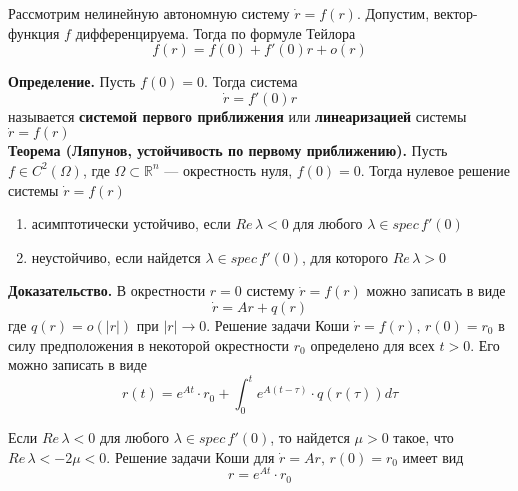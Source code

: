 Рассмотрим нелинейную автономную систему $\dot{r} = f(r)$. Допустим, вектор-функция $f$ дифференцируема. Тогда по формуле Тейлора
\begin{equation*}
    f(r) = f(0) + f'(0)r + o(r)
\end{equation*}

\noindent \textbf{Определение.} Пусть $f(0) = 0$. Тогда система
\begin{equation*}
    \dot{r} = f'(0)r
\end{equation*}
называется \textbf{системой первого приближения} или \textbf{линеаризацией} системы $\dot{r} = f(r)$\\

\noindent \textbf{Теорема (Ляпунов, устойчивость по первому приближению).} Пусть $f \in C^2(\Omega)$, где $\Omega \subset \mathbb{R}^n$ --- окрестность нуля, $f(0) = 0$. Тогда нулевое решение системы $\dot{r} = f(r)$
\begin{enumerate}
    \item асимптотически устойчиво, если $Re\, \lambda < 0$ для любого $\lambda \in spec\, f'(0)$
    \item неустойчиво, если найдется $\lambda \in spec\, f'(0)$, для которого $Re\, \lambda > 0$
\end{enumerate}

\noindent \textbf{Доказательство.} В окрестности $r = 0$ систему $\dot{r} = f(r)$ можно записать в виде
\begin{equation*}
    \dot{r} = Ar + q(r)
\end{equation*}
где $q(r) = o(|r|)$ при $|r| \to 0$. Решение задачи Коши $\dot{r} = f(r),\, r(0) = r_0$ в силу предположения в некоторой окрестности $r_0$ определено для всех $t > 0$. Его можно записать в виде
\begin{equation*}
    r(t) = e^{At}\cdot r_0 + \int_0^t e^{A(t-\tau)}\cdot q(r(\tau))d\tau
\end{equation*}

Если $Re\, \lambda < 0$ для любого $\lambda \in spec\, f'(0)$, то найдется $\mu > 0$ такое, что $Re\, \lambda < -2\mu < 0$. Решение задачи Коши для $\dot{r} = Ar,\, r(0) = r_0$ имеет вид
\begin{equation*}
    r = e^{At}\cdot r_0
\end{equation*}

